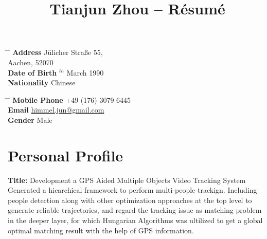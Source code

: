 \documentclass[10pt]{article} %
\begin{document}

\title{Tianjun Zhou -- Résumé} %


\parbox{0.5\textwidth}{ %
\begin{tabbing} %
\hspace{3cm} \= \hspace{4cm} \= \kill %
{\bf Address} \> J\"ulicher Stra\ss e 55,\\ %
\> Aachen, 52070 \\ %
{\bf Date of Birth} $^{th}$ March 1990 \\ %
{\bf Nationality} \> Chinese %
\end{tabbing}}
\hfill %
\parbox{0.5\textwidth}{ %
\begin{tabbing} %
\hspace{3cm} \= \hspace{4cm} \= \kill %
{\bf Mobile Phone} \> +49 (176) 3079 6445 \\ %
{\bf Email} \> \href{mailto:himmel.jun@gmail.com}{himmel.jun@gmail.com} \\ %
{\bf Gender} \> Male \\
\end{tabbing}}


\section{Personal Profile}

\textbf{Title:}  Development a GPS Aided Multiple Objects Video Tracking System\\

Generated a hiearchical framework to perform multi-people trackign. Including people detection along with other optimization approaches at the top level to generate reliable trajectories, and regard the tracking issue as matching problem in the deeper layer, for which Hungarian Algorithms was ultilized to get a global optimal matching result with the help of GPS information.\\
\end{document}
